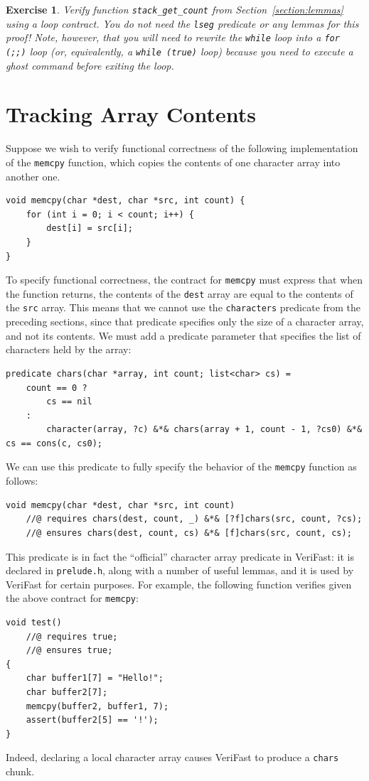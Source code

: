 \documentclass{article}
\newtheorem{exercise}{Exercise}
\begin{document}
\begin{exercise}\label{exercise:stack_tuerk}
Verify function \lstinline!stack_get_count! from Section~\ref{section:lemmas} using a loop contract. You do not need
the \lstinline!lseg! predicate or any lemmas for this proof! Note, however, that you will need to rewrite the \lstinline!while!
loop into a \lstinline!for (;;)! loop (or, equivalently, a \lstinline!while (true)! loop) because you need to execute a ghost
command before exiting the loop.
\end{exercise}

\section{Tracking Array Contents}\label{section:memcpy}

Suppose we wish to verify functional correctness of the
following implementation of the \lstinline|memcpy| function,
which copies the contents of one character array into another
one.

\begin{lstlisting}
void memcpy(char *dest, char *src, int count) {
    for (int i = 0; i < count; i++) {
        dest[i] = src[i];
    }
}
\end{lstlisting}

To specify functional correctness, the contract for
\lstinline|memcpy| must express that when the function returns,
the contents of the \lstinline|dest| array are equal to the
contents of the \lstinline|src| array. This means that we
cannot use the \lstinline|characters| predicate from the
preceding sections, since that predicate specifies only the
size of a character array, and not its contents. We must add a
predicate parameter that specifies the list of characters held
by the array:
\begin{lstlisting}
predicate chars(char *array, int count; list<char> cs) =
    count == 0 ?
        cs == nil
    :
        character(array, ?c) &*& chars(array + 1, count - 1, ?cs0) &*& cs == cons(c, cs0);
\end{lstlisting}
We can use this predicate to fully specify the behavior of the
\lstinline|memcpy| function as follows:
\begin{lstlisting}
void memcpy(char *dest, char *src, int count)
    //@ requires chars(dest, count, _) &*& [?f]chars(src, count, ?cs);
    //@ ensures chars(dest, count, cs) &*& [f]chars(src, count, cs);
\end{lstlisting}
This predicate is in fact the ``official'' character array
predicate in VeriFast: it is declared in \lstinline|prelude.h|,
along with a number of useful lemmas, and it is used by
VeriFast for certain purposes. For example, the following
function verifies given the above contract for
\lstinline|memcpy|:
\begin{lstlisting}
void test()
    //@ requires true;
    //@ ensures true;
{
    char buffer1[7] = "Hello!";
    char buffer2[7];
    memcpy(buffer2, buffer1, 7);
    assert(buffer2[5] == '!');
}
\end{lstlisting}
Indeed, declaring a local character array causes VeriFast to
produce a \lstinline|chars| chunk.
\end{document}
